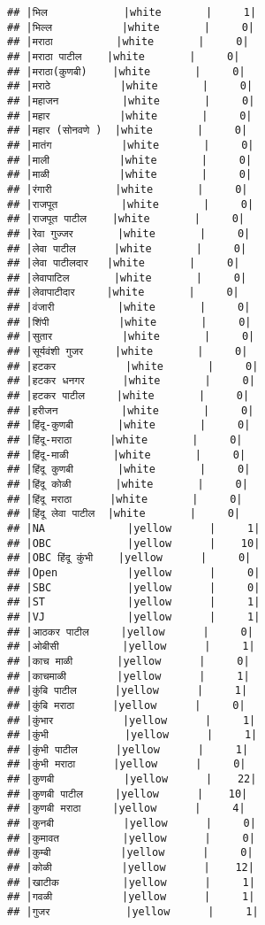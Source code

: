 \documentclass[
]{article}
\begin{document}
\begin{verbatim}
## |भिल            |white       |     1|
## |भिल्ल           |white       |     0|
## |मराठा          |white       |     0|
## |मराठा पाटील    |white       |     0|
## |मराठा(कुणबी)    |white       |     0|
## |मराठे           |white       |     0|
## |महाजन          |white       |     0|
## |महार           |white       |     0|
## |महार (सोनवणे )  |white       |     0|
## |मातंग           |white       |     0|
## |माली           |white       |     0|
## |माळी           |white       |     0|
## |रंगारी          |white       |     0|
## |राजपूत          |white       |     0|
## |राजपूत पाटील    |white       |     0|
## |रेवा गुज्जर       |white       |     0|
## |लेवा पाटील      |white       |     0|
## |लेवा पाटीलदार   |white       |     0|
## |लेवापाटिल       |white       |     0|
## |लेवापाटीदार     |white       |     0|
## |वंजारी          |white       |     0|
## |शिंपी           |white       |     0|
## |सुतार           |white       |     0|
## |सूर्यवंशी गुजर     |white       |     0|
## |हटकर           |white       |     0|
## |हटकर धनगर      |white       |     0|
## |हटकर पाटील     |white       |     0|
## |हरीजन          |white       |     0|
## |हिंदू-कुणबी       |white       |     0|
## |हिंदू-मराठा      |white       |     0|
## |हिंदू-माळी       |white       |     0|
## |हिंदू कुणबी       |white       |     0|
## |हिंदू कोळी       |white       |     0|
## |हिंदू मराठा      |white       |     0|
## |हिंदू लेवा पाटील  |white       |     0|
## |NA             |yellow      |     1|
## |OBC            |yellow      |    10|
## |OBC हिंदू कुंभी    |yellow      |     0|
## |Open           |yellow      |     0|
## |SBC            |yellow      |     0|
## |ST             |yellow      |     1|
## |VJ             |yellow      |     1|
## |आठकर पाटील     |yellow      |     0|
## |ओबीसी          |yellow      |     1|
## |काच माळी       |yellow      |     0|
## |काचमाळी        |yellow      |     1|
## |कुंबि पाटील      |yellow      |     1|
## |कुंबि मराठा      |yellow      |     0|
## |कुंभार           |yellow      |     1|
## |कुंभी            |yellow      |     1|
## |कुंभी पाटील      |yellow      |     1|
## |कुंभी मराठा      |yellow      |     0|
## |कुणबी           |yellow      |    22|
## |कुणबी पाटील     |yellow      |    10|
## |कुणबी मराठा     |yellow      |     4|
## |कुनबी           |yellow      |     0|
## |कुमावत          |yellow      |     0|
## |कुम्बी           |yellow      |     0|
## |कोळी           |yellow      |    12|
## |खाटीक          |yellow      |     1|
## |गवळी           |yellow      |     1|
## |गुजर            |yellow      |     1|

\end{verbatim}
\end{document}
